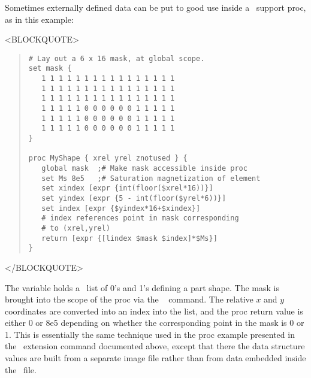 %
Sometimes externally defined data can be put to good use inside a
\Tcl\ support proc, as in this example:
\begin{rawhtml}
<BLOCKQUOTE>
\end{rawhtml}
\begin{quote}
\begin{verbatim}
# Lay out a 6 x 16 mask, at global scope.
set mask {
   1 1 1 1 1 1 1 1 1 1 1 1 1 1 1 1
   1 1 1 1 1 1 1 1 1 1 1 1 1 1 1 1
   1 1 1 1 1 1 1 1 1 1 1 1 1 1 1 1
   1 1 1 1 1 0 0 0 0 0 0 1 1 1 1 1
   1 1 1 1 1 0 0 0 0 0 0 1 1 1 1 1
   1 1 1 1 1 0 0 0 0 0 0 1 1 1 1 1
}

proc MyShape { xrel yrel znotused } {
   global mask  ;# Make mask accessible inside proc
   set Ms 8e5   ;# Saturation magnetization of element
   set xindex [expr {int(floor($xrel*16))}]
   set yindex [expr {5 - int(floor($yrel*6))}]
   set index [expr {$yindex*16+$xindex}]
   # index references point in mask corresponding
   # to (xrel,yrel)
   return [expr {[lindex $mask $index]*$Ms}]
}
\end{verbatim}
\end{quote}
\begin{rawhtml}
</BLOCKQUOTE>
\end{rawhtml}
The variable  holds a \Tcl\ list of 0's and 1's defining a part
shape.  The mask is brought into the scope of the  proc via
the \Tcl\  command.  The relative $x$ and $y$ coordinates are
converted into an index into the list, and the proc return value is
either 0 or 8e5 depending on whether the corresponding point in the mask
is 0 or 1.  This is essentially the same technique used in the
 proc example presented in the
 \MIF\ extension command
documented above,
except that there the data structure values are built from a separate
image file rather than from data embedded inside the \MIF\ file.

